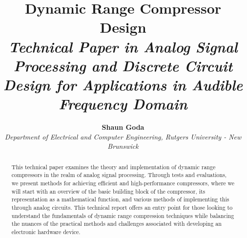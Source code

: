 \documentclass[10pt]{article}
\begin{document}
    \pagestyle{fancy}
    \fancyhf{}
    \renewcommand{\headrulewidth}{0pt}
    \fancypagestyle{firstpage}{
        \fancyhf{}
        \fancyfoot[C]{\footnotesize Page \thepage\ of \pageref{LastPage}}
        \renewcommand{\headrulewidth}{0pt}
    }

    \title{
        \vspace{-5ex}
        \textbf{\huge Dynamic Range Compressor Design}\\
        \textit{Technical Paper in Analog Signal Processing and Discrete Circuit Design for Applications in Audible Frequency Domain}
    }

    \author{
        \textbf{\Large Shaun Goda}\\
        \textit{\normalsize Department of Electrical and Computer Engineering, Rutgers University - New Brunswick}
    }

    \date{\vspace{-5ex}} %

    \maketitle

    \thispagestyle{firstpage}

    \begin{abstract}
        This technical paper examines the theory and implementation of dynamic range compressors in the realm of analog signal processing. Through tests and evaluations, we present methods for achieving efficient and high-performance compressors, where we will start with an overview of the basic building block of the compressor, its representation as a mathematical function, and various methods of implementing this through analog circuits. This technical report offers an entry point for those looking to understand the fundamentals of dynamic range compression techniques while balancing the nuances of the practical methods and challenges associated with developing an electronic hardware device.
    \end{abstract}
    
\end{document}
